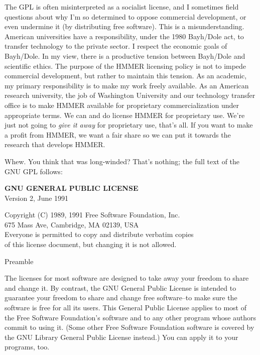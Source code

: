 The GPL is often misinterpreted as a socialist license, and I
sometimes field questions about why I'm so determined to oppose
commercial development, or even undermine it (by distributing free
software). This is a misunderstanding. American universities have a
responsibility, under the 1980 Bayh/Dole act, to transfer technology
to the private sector. I respect the economic goals of Bayh/Dole. In
my view, there is a productive tension between Bayh/Dole and
scientific ethics. The purpose of the HMMER licensing policy is not to
impede commercial development, but rather to maintain this tension.
As an academic, my primary responsibility is to make my work freely
available. As an American research university, the job of Washington
University and our technology transfer office is to make HMMER
available for proprietary commercialization under appropriate
terms. We can and do license HMMER for proprietary use. We're just not
going to {\em give it away} for proprietary use, that's all. If you
want to make a profit from HMMER, we want a fair share so we can put
it towards the research that develops HMMER.

Whew. You think that was long-winded? That's nothing; the full text of
the GNU GPL follows:

\begin{center}
{\bf GNU GENERAL PUBLIC LICENSE} \\
Version 2, June 1991
\end{center}

\begin{center}
Copyright (C) 1989, 1991 Free Software Foundation, Inc.\\
675 Mass Ave, Cambridge, MA 02139, USA\\
Everyone is permitted to copy and distribute verbatim copies\\
of this license document, but changing it is not allowed.\\
\end{center}

\begin{center}
Preamble
\end{center}

The licenses for most software are designed to take away your
freedom to share and change it.  By contrast, the GNU General Public
License is intended to guarantee your freedom to share and change free
software--to make sure the software is free for all its users.  This
General Public License applies to most of the Free Software
Foundation's software and to any other program whose authors commit to
using it.  (Some other Free Software Foundation software is covered by
the GNU Library General Public License instead.)  You can apply it to
your programs, too.

